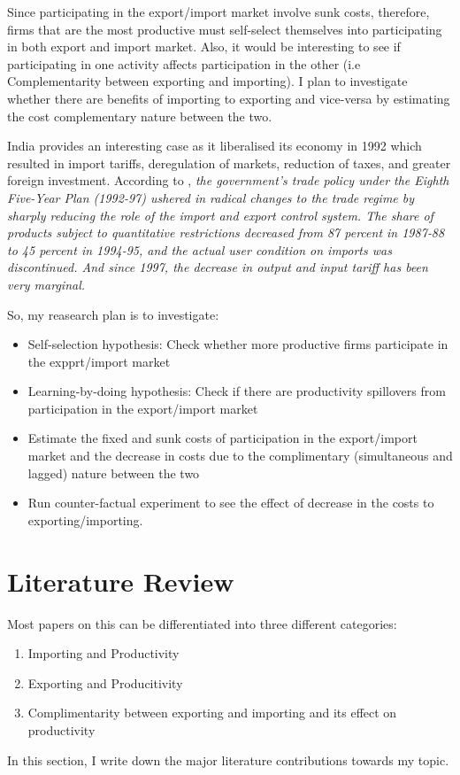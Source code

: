 \documentclass[11pt]{article}
\begin{document}
Since  participating in the export/import market   involve sunk
costs, therefore, firms that are the most productive must self-select
themselves into participating in both export and
import market.  Also, it would be interesting to see if participating
in one activity affects participation in the other (i.e
Complementarity between exporting and importing).  I plan to investigate whether there
are benefits of importing to exporting and vice-versa by estimating
the cost complementary nature between the two. 



India provides an interesting case as it liberalised its economy in 1992 which resulted in import
tariffs, deregulation of markets, reduction of taxes, and greater 
foreign investment. According to \cite{topalova2011trade}, \textit{the government's trade policy under the Eighth Five-Year Plan (1992-97) ushered
in radical changes to the trade regime by sharply reducing the role of
the import and export control system. The share of products subject to quantitative restrictions
decreased from 87 percent in 1987‐88 to 45 percent in 1994-95, and the actual user
condition on imports was discontinued. And since 1997, the decrease in
output and input tariff has been very marginal.}

So, my reasearch plan is to investigate:
\begin{itemize}
\item Self-selection hypothesis: Check whether more productive firms
  participate in the expprt/import market
\item Learning-by-doing hypothesis: Check if there are productivity
  spillovers from participation in the export/import market
\item Estimate the fixed and sunk costs of participation in the
  export/import market and the decrease in costs due to the
  complimentary (simultaneous and lagged) nature between the two
\item Run counter-factual experiment to see the effect of decrease in
  the costs to exporting/importing. 
\end{itemize}

\section{Literature Review}
Most papers on this can be differentiated into three different
categories:
\begin{enumerate}
\item Importing and Productivity 
\item Exporting and Producitivity
\item Complimentarity between exporting and importing and its effect
  on productivity
\end{enumerate}
In this section, I write down the major literature contributions
towards my topic. 
\end{document}
